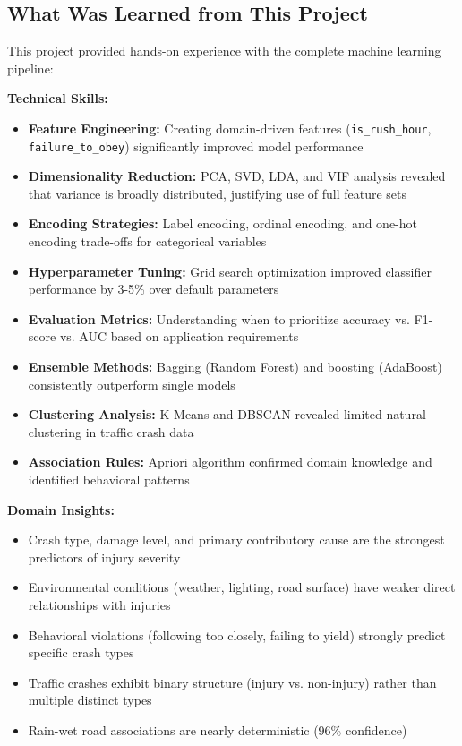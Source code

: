 \documentclass[12pt,man]{apa7}
\begin{document}
\subsection{What Was Learned from This Project}

This project provided hands-on experience with the complete machine learning pipeline:

\textbf{Technical Skills:}
\begin{itemize}
    \item \textbf{Feature Engineering:} Creating domain-driven features (\texttt{is\_rush\_hour}, \texttt{failure\_to\_obey}) significantly improved model performance
    \item \textbf{Dimensionality Reduction:} PCA, SVD, LDA, and VIF analysis revealed that variance is broadly distributed, justifying use of full feature sets
    \item \textbf{Encoding Strategies:} Label encoding, ordinal encoding, and one-hot encoding trade-offs for categorical variables
    \item \textbf{Hyperparameter Tuning:} Grid search optimization improved classifier performance by 3-5\% over default parameters
    \item \textbf{Evaluation Metrics:} Understanding when to prioritize accuracy vs. F1-score vs. AUC based on application requirements
    \item \textbf{Ensemble Methods:} Bagging (Random Forest) and boosting (AdaBoost) consistently outperform single models
    \item \textbf{Clustering Analysis:} K-Means and DBSCAN revealed limited natural clustering in traffic crash data
    \item \textbf{Association Rules:} Apriori algorithm confirmed domain knowledge and identified behavioral patterns
\end{itemize}

\textbf{Domain Insights:}
\begin{itemize}
    \item Crash type, damage level, and primary contributory cause are the strongest predictors of injury severity
    \item Environmental conditions (weather, lighting, road surface) have weaker direct relationships with injuries
    \item Behavioral violations (following too closely, failing to yield) strongly predict specific crash types
    \item Traffic crashes exhibit binary structure (injury vs. non-injury) rather than multiple distinct types
    \item Rain-wet road associations are nearly deterministic (96\% confidence)
\end{itemize}
\end{document}
